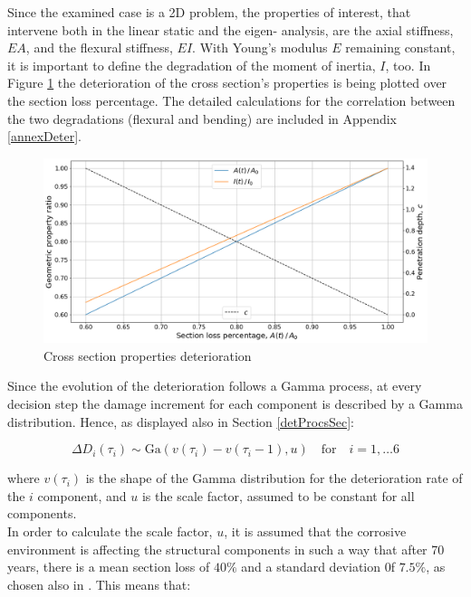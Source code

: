 Since the examined case is a 2D problem, the properties of interest, that intervene both in the linear static and the eigen- analysis, are the axial stiffness, $EA$, and the flexural stiffness, $EI$. With Young's modulus $E$ remaining constant, it is important to define the degradation of the moment of inertia, $I$, too. In Figure \ref{deterPlot} the deterioration of the cross section's properties is being plotted over the section loss percentage. The detailed calculations for the correlation between the two degradations (flexural and bending) are included in Appendix \ref{annexDeter}. 

\begin{figure}[H]
    \centering
	\includegraphics[width=0.85\linewidth]{Figures/deterPlot.png}
	\caption{Cross section properties deterioration}
	\label{deterPlot}
\end{figure}

Since the evolution of the deterioration follows a Gamma process, at every decision step the damage increment for each component is described by a Gamma distribution. Hence, as displayed also in Section \ref{detProcsSec}:

\begin{equation}
    \Delta D_i (\tau_i) \sim \mathrm{Ga}(v(\tau_i) - v(\tau_i - 1), u) \quad \text{for} \quad i = 1, \ldots 6 
\end{equation}

where $v(\tau_i)$ is the shape of the Gamma distribution for the deterioration rate of the $i$ component, and $u$ is the scale factor, assumed to be constant for all components.\\

In order to calculate the scale factor, $u$, it is assumed that the corrosive environment is affecting the structural components in such a way that after 70 years, there is a mean section loss of $40\%$ and a standard deviation 0f $7.5\%$, as chosen also in \cite{andriotis2019managing}. This means that:

